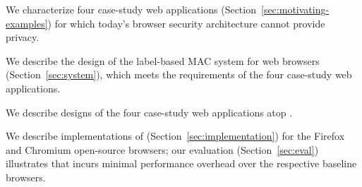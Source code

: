 \begin{CompactItemize}
\item We characterize four case-study web applications
  (Section~\ref{sec:motivating-examples}) for which today's browser security
  architecture cannot provide privacy.
\item We describe the design of the \sys{} label-based MAC system
  for web browsers (Section~\ref{sec:system}), which meets the
  requirements of the four case-study web applications.
\item We describe designs of the four case-study web applications atop
  \sys.
\item We describe implementations of \sys{}
  (Section~\ref{sec:implementation}) for the Firefox and Chromium
  open-source browsers; our evaluation (Section~\ref{sec:eval})
  illustrates that \sys{} incurs minimal performance overhead over the
  respective baseline browsers.
\end{CompactItemize}

